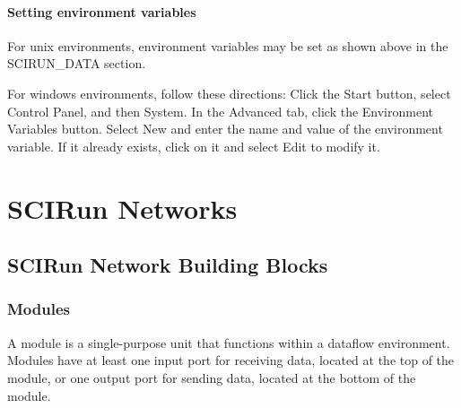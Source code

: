 \documentclass[fleqn,12pt,openany]{book}
\begin{document}



\subsubsection{Setting environment variables}
For unix environments, environment variables may be set as shown above in the SCIRUN\_DATA section.

For windows environments, follow these directions:
Click the Start button, select Control Panel, and then System.
In the Advanced tab, click the Environment Variables button.
Select New and enter the name and value of the environment variable.
If it already exists, click on it and select Edit to modify it.

\chapter{SCIRun Networks}

\section{SCIRun Network Building Blocks}




\subsection{Modules}\label{modules}

A module is a single-purpose unit that functions within a dataflow environment.
Modules have at least one input port for receiving data, located at the top of the module, or one output port for sending data, located at the bottom of the module.
\end{document}
